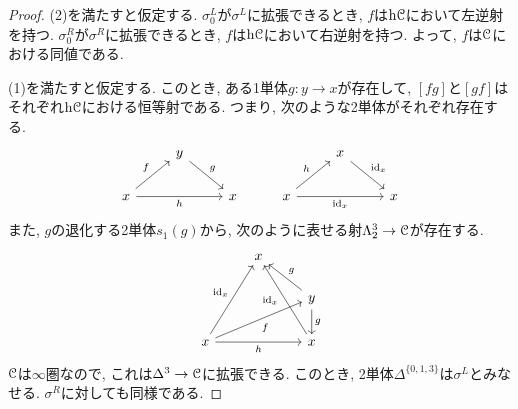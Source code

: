 \documentclass[uplatex, a4paper, 14Q, dvipdfmx]{jsreport}
\begin{document}
\begin{proof}
  (2)を満たすと仮定する.
  $\sigma^L_0$が$\sigma^L$に拡張できるとき, $f$は$\mathrm{h}\mathcal{C}$において左逆射を持つ. 
  $\sigma^R_0$が$\sigma^R$に拡張できるとき, $f$は$\mathrm{h}\mathcal{C}$において右逆射を持つ.
  よって, $f$は$\mathcal{C}$における同値である. 

  (1)を満たすと仮定する. 
  このとき, ある1単体$g : y \to x$が存在して, $[fg]$と$[gf]$はそれぞれ$\mathrm{h}\mathcal{C}$における恒等射である. 
  つまり, 次のような2単体がそれぞれ存在する. 
  \[\begin{tikzcd}
    & y &&& x \\
    x && x & x && x
    \arrow["h"', from=2-1, to=2-3]
    \arrow["f", from=2-1, to=1-2]
    \arrow["{\id_x}"', from=2-4, to=2-6]
    \arrow["{\id_x}", from=1-5, to=2-6]
    \arrow["g", from=1-2, to=2-3]
    \arrow["h", from=2-4, to=1-5]
  \end{tikzcd}\]
  また, $g$の退化する2単体$s_1(g)$から, 次のように表せる射$\Lambda^3_2 \to \mathcal{C}$が存在する. 
  \[\begin{tikzcd}
    & x \\
    && y \\
    x && x
    \arrow["h"', from=3-1, to=3-3]
    \arrow["f"', from=3-1, to=2-3]
    \arrow["g", from=2-3, to=3-3]
    \arrow["{\id_x}"{pos=0.6}, from=3-3, to=1-2]
    \arrow["{\id_x}", from=3-1, to=1-2]
    \arrow["g"', from=2-3, to=1-2]
  \end{tikzcd}\]
  $\mathcal{C}$は$\infty$圏なので, これは$\Delta^3 \to \mathcal{C}$に拡張できる. 
  このとき, 2単体$\Delta^{\{0,1,3\}}$は$\sigma^L$とみなせる. 
  $\sigma^R$に対しても同様である. 
\end{proof}
\end{document}
